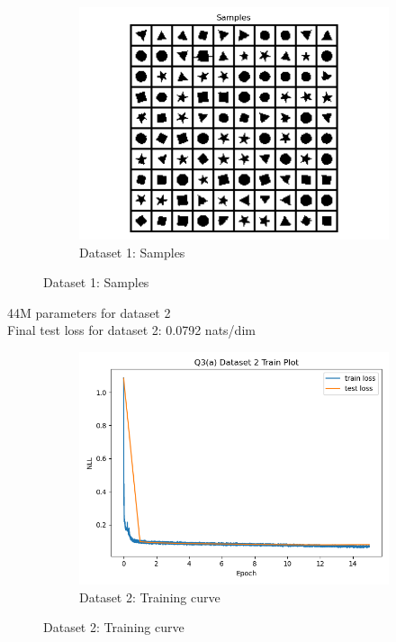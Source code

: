 \documentclass{article}
\begin{document}
\begin{enumerate}[(a)]
\begin{figure}[H]
\begin{subfigure}{0.45\textwidth}
        \includegraphics[width=\textwidth]{figures/q3_a_dset1_samples.png}
        \caption{Dataset 1: Samples}
    \end{subfigure}
\end{figure}
44M parameters for dataset 2 \\
Final test loss for dataset 2: 0.0792 nats/dim
\begin{figure}[H]
    \centering
    \begin{subfigure}{0.45\textwidth}
        \centering
        \includegraphics[width=\textwidth]{figures/q3_a_dset2_train_plot.png}
        \caption{Dataset 2: Training curve}
    \end{subfigure}
    \hspace{0.2in}

\end{figure}
\end{enumerate}
\end{document}
